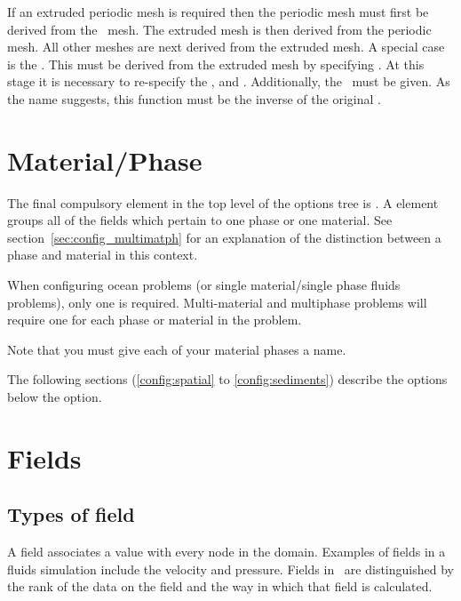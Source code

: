If an extruded periodic mesh is required then the periodic mesh must first
be derived from the \ mesh. The extruded mesh is then
derived from the periodic mesh. All other meshes are next derived from the
extruded mesh. A special case is the . This must be
derived from the extruded mesh by specifying
. At this stage it
is necessary to re-specify the ,
 and . Additionally, the
\ must be given. As the name suggests, this
function must be the inverse of the original .


\section{Material/Phase}
The final compulsory element in the top level of the options tree is
.  A  element groups all
of the fields which pertain to one phase or one material. See
section~\ref{sec:config_multimatph} for an explanation of the distinction
between a phase and material in this context.

When configuring ocean problems (or single material/single phase fluids
problems), only one  is required.  Multi-material
and multiphase problems will require one  for each
phase or material in the problem.

Note that you must give each of your material phases a name.

The following sections (\ref{config:spatial} to \ref{config:sediments}) describe the options below the
 option.

\section{Fields}
\subsection{Types of field}

A field associates a value with every node in the domain. Examples of fields
in a fluids simulation include the velocity and pressure. Fields in \fluidity\
are distinguished by the rank of the data on the field and the way in which
that field is calculated. 


